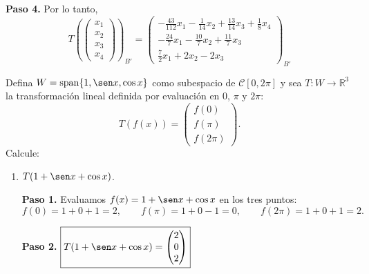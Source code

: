 \begin{prob}
\begin{myproof}
\textbf{Paso 4.} Por lo tanto,
\[
\boxed{T\left(\begin{pmatrix} x_1 \\ x_2 \\ x_3 \\ x_4 \end{pmatrix}\right)_{B'} =
\begin{pmatrix}
-\frac{43}{112}x_1 - \frac{1}{14}x_2 + \frac{13}{14}x_3 + \frac{1}{8}x_4 \\
-\frac{24}{7}x_1 - \frac{10}{7}x_2 + \frac{11}{7}x_3 \\
\frac{7}{2}x_1 + 2x_2 - 2x_3
\end{pmatrix}_{B'}}
\]
\end{myproof}
\end{prob}

\begin{prob}
Defina $W = \operatorname{span}\{1, \sen x, \cos x\}$ como subespacio de $\mathcal{C}[0,2\pi]$ y sea $T: W \rightarrow \mathbb{R}^3$ la transformación lineal definida por evaluación en $0$, $\pi$ y $2\pi$:
\[
T(f(x)) = \begin{pmatrix} f(0) \\ f(\pi) \\ f(2\pi) \end{pmatrix}.
\]
Calcule:

\begin{enumerate}[$a)$]
\item $T(1 + \sen x + \cos x)$.
\begin{myproof}
\textbf{Paso 1.} Evaluamos $f(x) = 1 + \sen x + \cos x$ en los tres puntos:
\[
f(0) = 1 + 0 + 1 = 2, \qquad
f(\pi) = 1 + 0 - 1 = 0, \qquad
f(2\pi) = 1 + 0 + 1 = 2.
\]

\textbf{Paso 2.} $\boxed{T(1 + \sen x + \cos x) = \begin{pmatrix} 2 \\ 0 \\ 2 \end{pmatrix}}$
\end{myproof}


\end{enumerate}
\end{prob}
